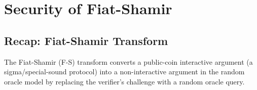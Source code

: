 \documentclass[11pt]{article}
\theoremstyle{plain}
\theoremstyle{definition}
\begin{document}
\section{Security of Fiat-Shamir}

\subsection{Recap: Fiat-Shamir Transform}

The Fiat-Shamir (F-S) transform converts a public-coin interactive argument
(a sigma/special-sound protocol) into a non-interactive argument in the random
oracle model by replacing the verifier's challenge with a random oracle query.
\end{document}
